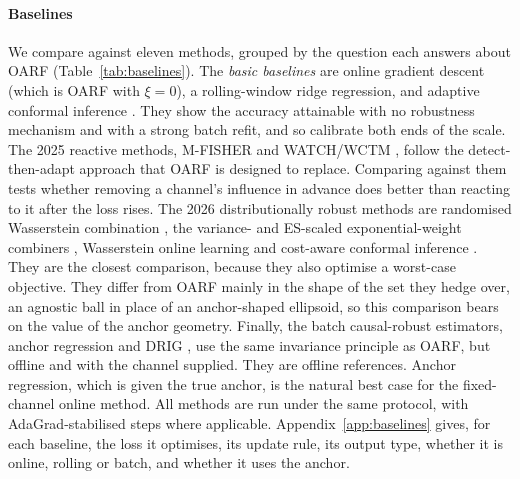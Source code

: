 \documentclass[authoryear,preprint,12pt]{elsarticle}
\theoremstyle{plain}
\theoremstyle{remark}
\newcommand{\OARF}{\textsc{OARF}}
\begin{document}
\paragraph{Baselines}
We compare against eleven methods, grouped by the question each answers about \OARF{}
(Table~\ref{tab:baselines}). The \emph{basic baselines} are online gradient descent
(which is \OARF{} with $\xi=0$), a rolling-window ridge regression, and adaptive
conformal inference \citep{gibbs2021aci}. They show the accuracy attainable with no
robustness mechanism and with a strong batch refit, and so calibrate both ends of the
scale. The 2025 reactive methods, M-FISHER \citep{mfisher2025} and WATCH/WCTM
\citep{watch2025}, follow the detect-then-adapt approach that \OARF{} is designed to
replace. Comparing against them tests whether removing a channel's influence in
advance does better than reacting to it after the loss rises. The 2026
distributionally robust methods are randomised Wasserstein combination
\citep{wang2026online}, the variance- and ES-scaled exponential-weight combiners
\citep{liu2026fcdro}, Wasserstein online learning \citep{chen2026wdro} and cost-aware
conformal inference \citep{costaci2026}. They are the closest comparison, because they
also optimise a worst-case objective. They differ from \OARF{} mainly in the shape of the set they hedge over, an agnostic ball in place of an anchor-shaped ellipsoid, so this comparison bears on the value of the anchor geometry. Finally, the batch
causal-robust estimators, anchor regression \citep{rothenhausler2021anchor} and DRIG
\citep{shen2023drig}, use the same invariance principle as \OARF{}, but offline and
with the channel supplied. They are offline references. Anchor regression, which is given the true anchor, is the natural best case for the fixed-channel online method. All methods are run under the same protocol, with
AdaGrad-stabilised steps where applicable. Appendix~\ref{app:baselines} gives, for
each baseline, the loss it optimises, its update rule, its output type, whether it is
online, rolling or batch, and whether it uses the anchor.
\end{document}
